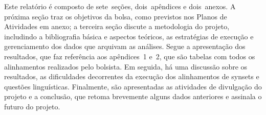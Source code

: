 Este relatório é composto de sete~seções, dois~apêndices e dois~anexos. A
próxima seção traz os objetivos da bolsa, como previstos nos Planos de
Atividades em anexo; a terceira seção discute a metodologia do projeto,
includindo a bibliografia básica e aspectos teóricos, as estratégias de
execução e gerenciamento dos dados que arquivam as análises. Segue a
apresentação dos resultados, que faz referência aos apêndices~1 e~2, que são
tabelas com todos os alinhamentos realizados pelo bolsista. Em seguida, há uma
discussão sobre os resultados, as dificuldades decorrentes da execução dos
alinhamentos de synsets e questões linguísticas. Finalmente, são apresentadas
as atividades de divulgação do projeto e a conclusão, que retoma brevemente
alguns dados anteriores e assinala o futuro do projeto.
